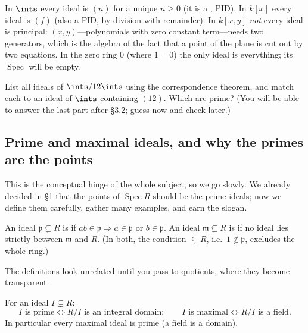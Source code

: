 \documentclass[11pt]{article}
\DeclareMathOperator{\Spec}{Spec}
\newcommand{\mfp}{\mathfrak{p}}
\newcommand{\mfm}{\mathfrak{m}}
\begin{document}
\begin{eexample}
In $\ints$ every ideal is $(n)$ for a unique $n\ge 0$ (it is a , PID). In $k[x]$ every ideal is $(f)$ (also a PID, by division with remainder). In
$k[x,y]$ \emph{not} every ideal is principal: $(x,y)$---polynomials with zero constant
term---needs two generators, which is the algebra of the fact that a point of the plane is
cut out by two equations. In the zero ring $0$ (where $1=0$) the only ideal is everything;
its $\Spec$ will be empty.
\end{eexample}

\begin{xca}
List all ideals of $\ints/12\ints$ using the correspondence theorem, and match each to an
ideal of $\ints$ containing $(12)$. Which are prime? (You will be able to answer the last
part after \S3.2; guess now and check later.)
\end{xca}

\subsection{Prime and maximal ideals, and why the primes are the points}

This is the conceptual hinge of the whole subject, so we go slowly. We already decided in \S1
that the points of $\Spec R$ should be the prime ideals; now we define them carefully, gather
many examples, and earn the slogan.

\begin{ddefinition}
An ideal $\mfp\subsetneq R$ is  if $ab\in\mfp\Rightarrow a\in\mfp$ or $b\in\mfp$.
An ideal $\mfm\subsetneq R$ is  if no ideal lies strictly between $\mfm$ and
$R$. (In both, the condition $\subsetneq R$, i.e.\ $1\notin\mfp$, excludes the whole ring.)
\end{ddefinition}

The definitions look unrelated until you pass to quotients, where they become transparent.

\begin{pproposition}
For an ideal $I\subsetneq R$:
\[
I \text{ is prime}\iff R/I \text{ is an integral domain};\qquad
I \text{ is maximal}\iff R/I \text{ is a field}.
\]
In particular every maximal ideal is prime (a field is a domain).
\end{pproposition}
\end{document}

